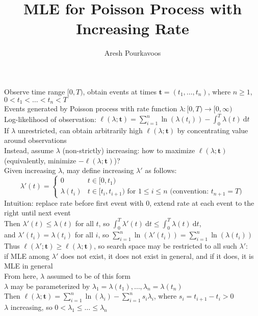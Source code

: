 \documentclass{article}
\newcommand{\rparen}{)}
\newcommand{\interval}[2]{\lbrack #1, #2 \rparen}
\begin{document}
\title{MLE for Poisson Process with Increasing Rate}
\author{Aresh Pourkavoos}
\maketitle


Observe time range $\interval{0}{T}$, obtain events at times $\mathbf{t} = (t_1, \ldots, t_n)$,
where $n \geq 1$, $0 < t_1 < \ldots < t_n < T$ \\
Events generated by Poisson process with rate function
$\lambda: \interval{0}{T} \rightarrow \interval{0}{\infty}$ \\
Log-likelihood of observation: $\ell(\lambda; \mathbf{t}) = \sum_{i=1}^n \ln(\lambda(t_i)) - \int_0^T\lambda(t)\ \mathrm{d}t$ \\
If $\lambda$ unrestricted, can obtain arbitrarily high $\ell(\lambda; \mathbf{t})$ by concentrating value around observations \\
Instead, assume $\lambda$ (non-strictly) increasing:
how to maximize $\ell(\lambda; \mathbf{t})$ (equivalently, minimize $-\ell(\lambda; \mathbf{t})$)? \\
Given increasing $\lambda$, may define increasing $\lambda'$ as follows:
\[
\lambda'(t) =
\begin{cases}
  0 & t \in \interval{0}{t_1} \\
  \lambda(t_i) & t \in \interval{t_i}{t_{i+1}} \text{ for } 1 \leq i \leq n \text{ (convention: $t_{n+1} = T$)}
\end{cases}
\]
Intuition: replace rate before first event with $0$, extend rate at each event to the right until next event \\
Then $\lambda'(t) \leq \lambda(t)$ for all $t$,
so $\int_0^T\lambda'(t)\ \mathrm{d}t \leq \int_0^T\lambda(t)\ \mathrm{d}t$, \\
and $\lambda'(t_i) = \lambda(t_i)$ for all $i$,
so $\sum_{i=1}^n \ln(\lambda'(t_i)) = \sum_{i=1}^n \ln(\lambda(t_i))$ \\
Thus $\ell(\lambda'; \mathbf{t}) \geq \ell(\lambda; \mathbf{t})$,
so search space may be restricted to all such $\lambda'$: \\
if MLE among $\lambda'$ does not exist, it does not exist in general,
and if it does, it is MLE in general \\
From here, $\lambda$ assumed to be of this form \\
$\lambda$ may be parameterized by $\lambda_1 = \lambda(t_1), \ldots, \lambda_n = \lambda(t_n)$ \\
Then $\ell(\lambda; \mathbf{t}) = \sum_{i=1}^n \ln(\lambda_i) - \sum_{i=1}^n s_i\lambda_i$,
where $s_i = t_{i+1}-t_i > 0$ \\
$\lambda$ increasing, so $0 < \lambda_1 \leq \ldots \leq \lambda_n$ \\
\end{document}
